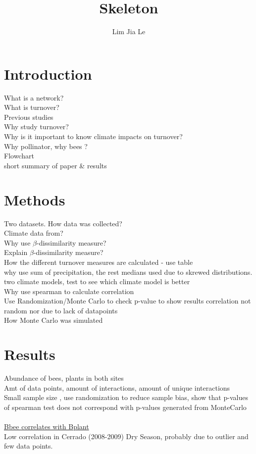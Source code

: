 \documentclass[11pt]{article}
\title{\textbf{\LARGE{Skeleton}}}
\date{}
\author{%
\large{Lim Jia Le}
}
\makeatletter
\renewcommand{\maketitle}{\bgroup\setlength{\parindent}{0pt}
\begin{flushleft}
  \textbf{\@title} %

  \@author
\end{flushleft}\egroup
}
\makeatother
\begin{document}
\maketitle
\smallskip
\tableofcontents


\section{Introduction} %
What is a network? \\
What is turnover? \\
Previous studies \\
Why study turnover? \\
Why is it important to know climate impacts on turnover? \\
Why pollinator, why bees ? \\
Flowchart \\
short summary of paper \& results \\

\section{Methods} %
Two datasets. How data was collected?\\
Climate data from? \\
Why use $\beta$-dissimilarity measure? \\
Explain $\beta$-dissimilarity measure? \\
How the different turnover measures are calculated - use table \\
why use sum of precipitation, the rest medians used due to skrewed distributions. \\
two climate models, test to see which climate model is better \\
Why use spearman to calculate correlation \\
Use Randomization/Monte Carlo to check p-value to show results correlation not random nor due to lack of datapoints \\
How Monte Carlo was simulated \\

\section{Results} %
Abundance of bees, plants in both sites \\
Amt of data points, amount of interactions, amount of unique interactions \\
Small sample size , use randomization to reduce sample bias, show that p-values of spearman test does not correspond with p-values generated from MonteCarlo \\
\\
\underline{Bbee correlates with Bplant} \\
Low correlation in Cerrado (2008-2009) Dry Season, probably due to outlier and few data points.\\
\end{document}
